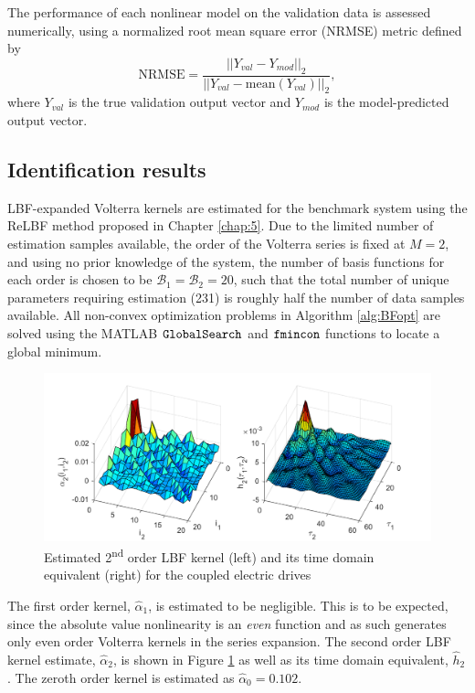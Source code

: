 The performance of each nonlinear model on the validation data is assessed numerically, using a normalized root mean square error (NRMSE) metric defined by 
\begin{equation}
\text{NRMSE} = \frac{||Y_{val}-Y_{mod}||_2}{||Y_{val} - \text{mean}(Y_{val}) ||_2},
\label{eqn:NRMSE_CED}
\end{equation}
where $Y_{val}$ is the true validation output vector and $Y_{mod}$ is the model-predicted output vector.

\subsection{Identification results}
\label{sec:Results_CED}

LBF-expanded Volterra kernels are estimated for the benchmark system using the ReLBF method proposed in Chapter \ref{chap:5}. Due to the limited number of estimation samples available, the order of the Volterra series is fixed at $M=2$, and using no prior knowledge of the system, the number of basis functions for each order is chosen to be $\mathcal{B}_1=\mathcal{B}_2=20$, such that the total number of unique parameters requiring estimation (231) is roughly half the number of data samples available. All non-convex optimization problems in Algorithm \ref{alg:BFopt} are solved using the MATLAB $\text{\tt{GlobalSearch}}$ and $\text{\tt{fmincon}}$ functions to locate a global minimum.

\begin{figure}[!b]
\centering
\includegraphics[width=\textwidth]{Chapter6_CaseStudies/Kernels2ndOrder_CED_Coloured}
\caption{Estimated 2\textsuperscript{nd} order LBF kernel (left) and its time domain equivalent (right) for the coupled electric drives} \label{fig:Kernel2_CED}
\end{figure}

The first order kernel, $\hat{\alpha}_1$, is estimated to be negligible. This is to be expected, since the absolute value nonlinearity is an \emph{even} function and as such generates only even order Volterra kernels in the series expansion. The second order LBF kernel estimate, $\hat{\alpha}_2$, is shown in Figure \ref{fig:Kernel2_CED} as well as its time domain equivalent, $\hat{h}_2$. The zeroth order kernel is estimated as $\hat{\alpha}_0 = 0.102$.

